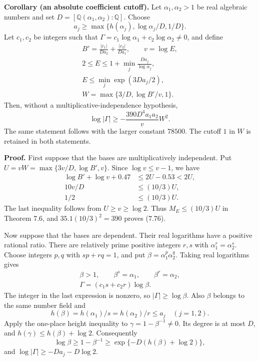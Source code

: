 \documentclass[
  11pt,
  a4paper,
]{article}
\begin{document}
\textbf{Corollary (an absolute coefficient cutoff).} Let
\(\alpha_1,\alpha_2>1\) be real algebraic numbers and set
\(D=[\mathbb Q(\alpha_1,\alpha_2):\mathbb Q]\). Choose \[
a_j\ge\max\{h(\alpha_j),\log\alpha_j/D,1/D\}.
\] Let \(c_1,c_2\) be integers such that
\(\Gamma=c_1\log\alpha_1+c_2\log\alpha_2\ne0\), and define \[
\begin{gathered}
B'=\frac{|c_1|}{Da_2}+\frac{|c_2|}{Da_1},\qquad v=\log E,\\
2\le E\le1+\min_j\frac{Da_j}{\log\alpha_j},\\
E\le\min_j\exp(3Da_j/2),\\
W=\max\{3/D,\log B'/v,1\}.
\end{gathered}
\] Then, without a multiplicative-independence hypothesis, \[
\log|\Gamma|\ge-\frac{390D^4a_1a_2}{v}W^2. \tag{7.76}
\] The same statement follows with the larger constant \(78500\). The
cutoff \(1\) in \(W\) is retained in both statements.

\textbf{Proof.} First suppose that the bases are multiplicatively
independent. Put \(U=vW=\max\{3v/D,\log B',v\}\). Since
\(\log v\le v-1\), we have \[
\begin{aligned}
\log B'+\log v+0.47&\le2U-0.53<2U,\\
10v/D&\le(10/3)U,\\
1/2&\le(10/3)U.
\end{aligned}
\] The last inequality follows from \(U\ge v\ge\log2\). Thus
\(M_E\le(10/3)U\) in Theorem 7.6, and \(35.1(10/3)^2=390\) proves
(7.76).

Now suppose that the bases are dependent. Their real logarithms have a
positive rational ratio. There are relatively prime positive integers
\(r,s\) with \(\alpha_1^r=\alpha_2^s\). Choose integers \(p,q\) with
\(sp+rq=1\), and put \(\beta=\alpha_1^p\alpha_2^q\). Taking real
logarithms gives \[
\begin{gathered}
\beta>1,\qquad \beta^s=\alpha_1,\qquad \beta^r=\alpha_2,\\
\Gamma=(c_1s+c_2r)\log\beta.
\end{gathered}
\] The integer in the last expression is nonzero, so
\(|\Gamma|\ge\log\beta\). Also \(\beta\) belongs to the same number
field and \[
h(\beta)=h(\alpha_1)/s=h(\alpha_2)/r\le a_j
\quad(j=1,2).
\] Apply the one-place height inequality to \(\gamma=1-\beta^{-1}\ne0\).
Its degree is at most \(D\), and \(h(\gamma)\le h(\beta)+\log2\).
Consequently \[
\log\beta\ge1-\beta^{-1}
\ge\exp\{-D(h(\beta)+\log2)\},
\] and \(\log|\Gamma|\ge-Da_j-D\log2\).
\end{document}
